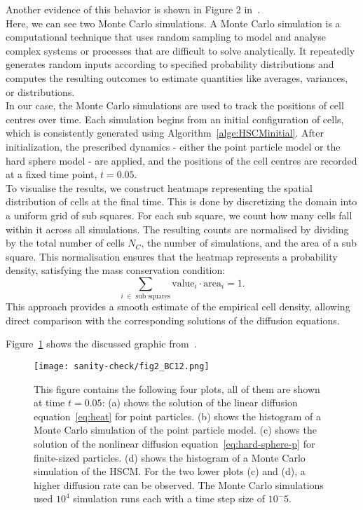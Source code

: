 Another evidence of this behavior is shown in Figure 2 in~\cite{Bruna2012}. \\
Here, we can see two Monte Carlo simulations. 
A Monte Carlo simulation is a computational technique that uses random sampling to model and analyse complex systems or processes that are difficult to solve analytically. 
It repeatedly generates random inputs according to specified probability distributions and computes the resulting outcomes to estimate quantities like averages, variances, or distributions. \\
In our case, the Monte Carlo simulations are used to track the positions of cell centres over time. 
Each simulation begins from an initial configuration of cells, which is consistently generated using Algorithm~\ref{alge:HSCMinitial}. 
After initialization, the prescribed dynamics - either the point particle model or the hard sphere model - are applied, and the positions of the cell centres are recorded at a fixed time point, $t=0.05$. \\
To visualise the results, we construct heatmaps representing the spatial distribution of cells at the final time. 
This is done by discretizing the domain into a uniform grid of sub squares. 
For each sub square, we count how many cells fall within it across all simulations. 
The resulting counts are normalised by dividing by the total number of cells $N_C$, the number of simulations, and the area of a sub square. This normalisation ensures that the heatmap represents a probability density, satisfying the mass conservation condition: \[\sum\limits_{i \: \in \text{ sub squares}} \text{value}_i \cdot \text{area}_i = 1. \]
This approach provides a smooth estimate of the empirical cell density, allowing direct comparison with the corresponding solutions of the diffusion equations.

Figure~\ref{fig:fig2BC12} shows the discussed graphic from~\cite{Bruna2012}. 
\begin{figure}
	\centering
    \texttt{[image: sanity-check/fig2\_BC12.png]}
    \caption{
    This figure contains the following four plots, all of them are shown at time \( t=0.05 \): \newline
    \hspace*{0.5em}(a) shows the solution of the linear diffusion equation~\ref{eq:heat} for point particles. \newline
    \hspace*{0.5em}(b) shows the histogram of a Monte Carlo simulation of the point particle model. \newline
    \hspace*{0.5em}(c) shows the solution of the nonlinear diffusion equation~\ref{eq:hard-sphere-p} for finite-sized particles. \newline
    \hspace*{0.5em}(d) shows the histogram of a Monte Carlo simulation of the HSCM. \newline
    For the two lower plots (c) and (d), a higher diffusion rate can be observed. 
    The Monte Carlo simulations used $10^4$ simulation runs each with a time step size of $10^-5$.
    }
    \label{fig:fig2BC12}
\end{figure}

